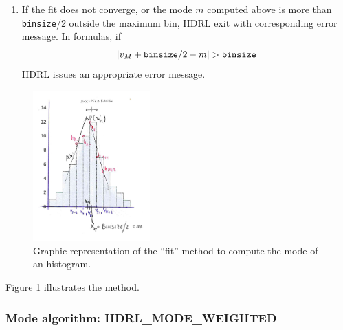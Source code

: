 \begin{enumerate}
\item If the fit does not converge, or the  mode $m$ computed above is more
  than {\tt binsize}/2 outside the maximum bin, HDRL exit with corresponding
  error message.
  In formulas, if
  \[
  \left| v_M+{\tt binsize}/2-m \right| >{\tt binsize}
  \]
  HDRL issues an appropriate error message.
\end{enumerate}


\begin{figure}
\begin{center}\subfigure
\includegraphics[width=0.4\textwidth]{figures/mode_fig1.jpg}
\caption{Graphic representation of the ``fit'' method to compute the mode of an histogram.}
\label{fig:fit}
\end{center}
\end{figure}
Figure \ref{fig:fit} illustrates the method.


\subsubsection{Mode algorithm: HDRL\_MODE\_WEIGHTED}
\label{sec:algorithms:robust_mean:mode_weighted}

